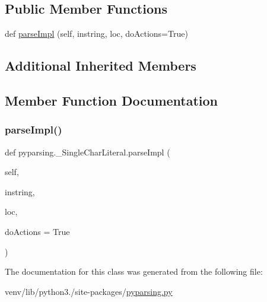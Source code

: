 \subsection*{Public Member Functions}
\begin{DoxyCompactItemize}
\item 
def \hyperlink{classpyparsing_1_1__SingleCharLiteral_aed5019d282377af520cc9c6a1350e7b3}{parse\+Impl} (self, instring, loc, do\+Actions=True)
\end{DoxyCompactItemize}
\subsection*{Additional Inherited Members}


\subsection{Member Function Documentation}
\mbox{\label{classpyparsing_1_1__SingleCharLiteral_aed5019d282377af520cc9c6a1350e7b3}} 
\subsubsection{\texorpdfstring{parse\+Impl()}{parseImpl()}}
{\footnotesize\ttfamily def pyparsing.\+\_\+\+Single\+Char\+Literal.\+parse\+Impl (\begin{DoxyParamCaption}\item[{}]{self,  }\item[{}]{instring,  }\item[{}]{loc,  }\item[{}]{do\+Actions = {\ttfamily True} }\end{DoxyParamCaption})}



The documentation for this class was generated from the following file\+:\begin{DoxyCompactItemize}
\item 
venv/lib/python3./site-\/packages/\hyperlink{pyparsing_8py}{pyparsing.\+py}\end{DoxyCompactItemize}
